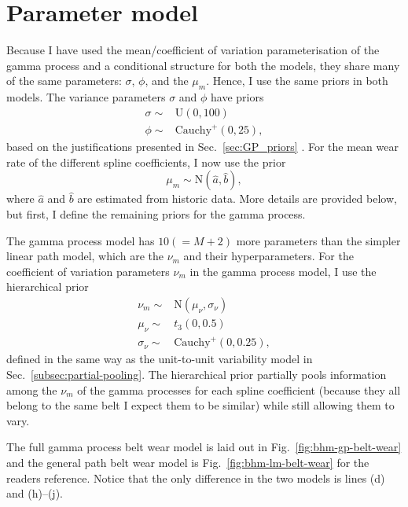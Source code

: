 \section{Parameter model} \label{sec:belt_wear_priors}
Because I have used the mean/coefficient of variation parameterisation of the gamma process and a conditional structure for both the models, they share many of the same parameters: $\sigma$, $\phi$, and the $\mu_m$. Hence, I use the same priors in both models. The variance parameters $\sigma$ and $\phi$ have priors
\begin{align*}
  \sigma \sim & \mbox{U}(0, 100)         \\
  \phi   \sim & \mbox{Cauchy}^{+}(0, 25),
\end{align*}
based on the justifications presented in Sec.~\ref{sec:GP_priors} \citep[Chap.~17]{BDA2020}. For the mean wear rate of the different spline coefficients, I now use the prior 
\begin{equation*}
  \mu_m \sim \mbox{N}(\hat{a}, \hat{b}),
\end{equation*}
where $\hat{a}$ and $\hat{b}$ are estimated from historic data. More details are provided below, but first, I define the remaining priors for the gamma process.

The gamma process model has $10(= M + 2)$ more parameters than the simpler linear path model, which are the $\nu_m$ and their hyperparameters. For the coefficient of variation parameters $\nu_m$ in the gamma process model, I use the hierarchical prior
\begin{align*}
  \nu_m      \sim & \mbox{N}(\mu_\nu, \sigma_\nu) \\
  \mu_\nu    \sim & t_3(0, 0.5)            \\
  \sigma_\nu \sim & \mbox{Cauchy}^{+}(0, 0.25),
\end{align*}
defined in the same way as the unit-to-unit variability model in Sec.~\ref{subsec:partial-pooling}. The hierarchical prior partially pools information among the $\nu_m$ of the gamma processes for each spline coefficient (because they all belong to the same belt I expect them to be similar) while still allowing them to vary.

The full gamma process belt wear model is laid out in Fig.~\ref{fig:bhm-gp-belt-wear} and the general path belt wear model is Fig.~\ref{fig:bhm-lm-belt-wear} for the readers reference. Notice that the only difference in the two models is lines (d) and (h)--(j).

